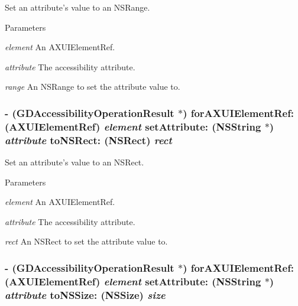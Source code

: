 Set an attribute's value to an NSRange. 
\begin{DoxyParams}{Parameters}
\item[{\em element}]An AXUIElementRef. \item[{\em attribute}]The accessibility attribute. \item[{\em range}]An NSRange to set the attribute value to. \end{DoxyParams}
\hypertarget{interface_g_d_accessibility_manager_acb7c3a3be1de6bdf614a08cc461f5c75}{
\subsubsection[{forAXUIElementRef:setAttribute:toNSRect:}]{\setlength{\rightskip}{0pt plus 5cm}-\/ ({\bf GDAccessibilityOperationResult} $\ast$) forAXUIElementRef: (AXUIElementRef) {\em element}\/ setAttribute: (NSString $\ast$) {\em attribute}\/ toNSRect: (NSRect) {\em rect}}}
\label{interface_g_d_accessibility_manager_acb7c3a3be1de6bdf614a08cc461f5c75}


Set an attribute's value to an NSRect. 
\begin{DoxyParams}{Parameters}
\item[{\em element}]An AXUIElementRef. \item[{\em attribute}]The accessibility attribute. \item[{\em rect}]An NSRect to set the attribute value to. \end{DoxyParams}
\hypertarget{interface_g_d_accessibility_manager_a9ebf98303317b2e55a27ca31bef44942}{
\subsubsection[{forAXUIElementRef:setAttribute:toNSSize:}]{\setlength{\rightskip}{0pt plus 5cm}-\/ ({\bf GDAccessibilityOperationResult} $\ast$) forAXUIElementRef: (AXUIElementRef) {\em element}\/ setAttribute: (NSString $\ast$) {\em attribute}\/ toNSSize: (NSSize) {\em size}}}
\label{interface_g_d_accessibility_manager_a9ebf98303317b2e55a27ca31bef44942}


